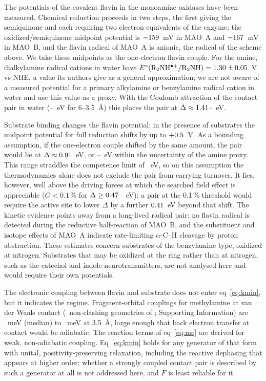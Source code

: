 \documentclass[journal=jpcbfk,manuscript=article,layout=traditional]{achemso}
\begin{document}
The potentials of the covalent flavin in the monoamine oxidases have been
measured. Chemical reduction proceeds in two steps, the first giving the
semiquinone and each requiring two electron equivalents of the enzyme; the
oxidized/semiquinone midpoint potential is $-159$~mV in MAO~A and
$-167$~mV in MAO~B,\cite{Sablin2001} and the flavin radical of MAO~A is
anionic,\cite{Kay2007} the radical of the scheme above. We take these midpoints
as the one-electron flavin couple. For the amine, dialkylamine radical cations
in water have $E^\circ({\rm R_2NH^{\bullet+}/R_2NH}) = 1.30\pm0.05$~V vs
NHE, a value its authors give as a general approximation;\cite{Jonsson1996} we
are not aware of a measured potential for a primary alkylamine or benzylamine
radical cation in water and use this value as a proxy. With the Coulomb
attraction of the contact pair in water (\CoulLo--\CoulHi~eV for 6--3.5~\AA)
this places the pair at $\Delta\approx1.41$--\DeltaMAOhi~eV.

Substrate binding changes the flavin potential: in the presence of substrates
the midpoint potential for full reduction shifts by up to
$+0.5$~V.\cite{Sablin2001} As a bounding assumption, if the one-electron
couple shifted by the same amount, the pair would lie at
$\Delta\approx0.91$~eV, or \DeltaMAOsubLo--\DeltaMAOsubHi~eV within the
uncertainty of the amine proxy. This range straddles the competence limit of
\DeltaMaxHi~eV, so on this assumption the thermodynamics alone does not
exclude the pair from carrying turnover. It lies, however, well above the
driving forces at which the searched field effect is appreciable ($G<0.1$\,\%
for $\Delta\ge0.47$--\ThrTenthOneSens~eV): a pair at the 0.1\,\%
threshold would require the active site to lower $\Delta$ by a further
$0.41$~eV beyond that shift. The kinetic evidence points away from a
long-lived radical pair: no flavin radical is detected during the reductive
half-reaction of MAO~B,\cite{Walker1994} and the substituent and isotope
effects of MAO~A indicate rate-limiting $\alpha$-C--H cleavage by proton
abstraction.\cite{Miller1999} These estimates concern substrates of the
benzylamine type, oxidized at nitrogen. Substrates that may be oxidized at the
ring rather than at nitrogen, such as the catechol and indole
neurotransmitters, are not analysed here and would require their own
potentials.

The electronic coupling between flavin and substrate does not enter
eq~\ref{eq:kmin}, but it indicates the regime. Fragment-orbital couplings for
methylamine at van der Waals contact (\nScanValid\ non-clashing geometries of
\nScan; Supporting Information) are \tContactMed~meV (median) to
\tContactMax~meV at 3.5~\AA, large enough that back electron transfer at contact
would be adiabatic. The reaction terms of eq~\ref{eq:me} are derived for weak,
non-adiabatic coupling.\cite{Fay2018} Eq~\ref{eq:kmin} holds for any generator
of that form with unital, positivity-preserving relaxation, including the
reactive dephasing that appears at higher order; whether a strongly coupled
contact pair is described by such a generator at all is not addressed here, and
$F$ is least reliable for it.
\end{document}
